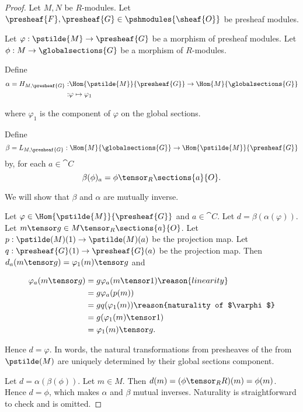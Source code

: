 
\begin{proof}
Let $M,N$ be $R$-modules. 
Let $\presheaf{F},\presheaf{G} \in \pshmodules{\sheaf{O}}$ be presheaf modules.

Let $\varphi:\pstilde{M} \rightarrow \presheaf{G}$ be a morphism of presheaf modules.
Let $\phi: M \rightarrow \globalsections{G}$ be a morphism of $R$-modules.

Define
\begin{align*}
\alpha = H_{M,\presheaf{G}} :& 
	\Hom{\pstilde{M}}{\presheaf{G}} \rightarrow \Hom{M}{\globalsections{G}} \\
	:& \varphi \mapsto \varphi_1
\end{align*}

where $\varphi_1$ is the component of $\varphi$ on the global sections.

Define 
\[\beta = L_{M,\presheaf{G}}: 
	\Hom{M}{\globalsections{G}} \rightarrow \Hom{\pstilde{M}}{\presheaf{G}}
\] 
by, for each $a\in \cat{C}$
\[ \beta(\phi)_a = \phi \tensor_R \sections{a}{O}.\]

We will show that $\beta$ and $\alpha$ are mutually inverse. 

Let $\varphi \in \Hom{\pstilde{M}}{\presheaf{G}}$
and $a\in \cat{C}$.
Let $d = \beta(\alpha(\varphi))$. 
Let $m \tensor g \in M \tensor_R \sections{a}{O}$.
Let $p: \pstilde(M)(1)\rightarrow \pstilde(M)(a)$ be the projection map.
Let $q: \presheaf{G}(1)\rightarrow \presheaf{G}(a)$ be the projection map.
Then $d_a(m \tensor g) = \varphi_1(m) \tensor g$
and

\begin{align*}
	\varphi_a(m \tensor g) &=  g \varphi_a(m \tensor 1) \reason{linearity}\\
		&= g \varphi_a(p(m)) \\
		&= g q(\varphi_1(m)) \reason{naturality of $\varphi$}\\
		&= g (\varphi_1(m) \tensor 1) \\
		&= \varphi_1(m) \tensor g.
\end{align*}

Hence $d = \varphi$. 
In words, the natural transformations from presheaves of the from $\pstilde(M)$ 
are uniquely determined by their global sections component.

Let $d = \alpha(\beta(\phi))$. 
Let $m \in M$.
Then $d(m) = (\phi \tensor_R R)(m) = \phi(m)$.
Hence $d = \phi$, which makes $\alpha$ and $\beta$ mutual inverses.
Naturality is straightforward to check and is omitted.
\end{proof}